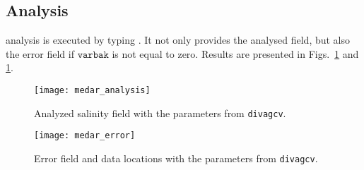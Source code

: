 \subsection{Analysis}

\diva analysis is executed by typing . It not only provides the analysed field, but also the error field if $\texttt{varbak}$ is not equal to zero. Results are presented in Figs.~\ref{analysisCL1} and \ref{analysisCL1}.

\begin{figure}[htpb]
\centering
\texttt{[image: medar\_analysis]}
\caption{Analyzed salinity field with the parameters from \texttt{divagcv}.\label{analysisCL1}}
\end{figure}


\begin{figure}[htpb]
\centering
\texttt{[image: medar\_error]}
\caption{Error field and data locations with the parameters from \texttt{divagcv}.\label{errorCL1}}
\end{figure}



\clearpage
%




%
%



